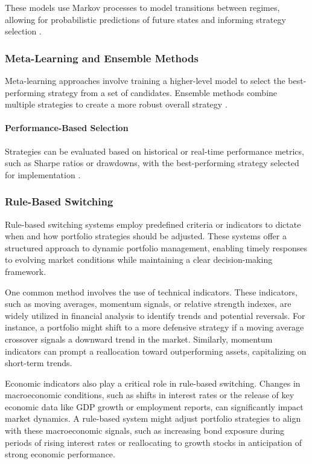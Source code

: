 These models use Markov processes to model transitions between regimes, allowing for probabilistic predictions of future states and informing strategy selection \cite{hamilton1989new}.

\subsubsection{Meta-Learning and Ensemble Methods}

Meta-learning approaches involve training a higher-level model to select the best-performing strategy from a set of candidates. Ensemble methods combine multiple strategies to create a more robust overall strategy \cite{huang2019building}.

\paragraph{Performance-Based Selection}

Strategies can be evaluated based on historical or real-time performance metrics, such as Sharpe ratios or drawdowns, with the best-performing strategy selected for implementation \cite{poterba2000portfolio}.

\subsubsection{Rule-Based Switching}
Rule-based switching systems employ predefined criteria or indicators to dictate when and how portfolio strategies should be adjusted. These systems offer a structured approach to dynamic portfolio management, enabling timely responses to evolving market conditions while maintaining a clear decision-making framework.

One common method involves the use of technical indicators. These indicators, such as moving averages, momentum signals, or relative strength indexes, are widely utilized in financial analysis to identify trends and potential reversals. For instance, a portfolio might shift to a more defensive strategy if a moving average crossover signals a downward trend in the market. Similarly, momentum indicators can prompt a reallocation toward outperforming assets, capitalizing on short-term trends.

Economic indicators also play a critical role in rule-based switching. Changes in macroeconomic conditions, such as shifts in interest rates or the release of key economic data like GDP growth or employment reports, can significantly impact market dynamics. A rule-based system might adjust portfolio strategies to align with these macroeconomic signals, such as increasing bond exposure during periods of rising interest rates or reallocating to growth stocks in anticipation of strong economic performance.

